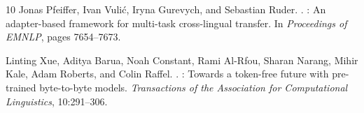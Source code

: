 \begin{thebibliography}{10}
Jonas Pfeiffer, Ivan Vuli\'c, Iryna Gurevych, and Sebastian Ruder.
.
: An adapter-based framework for multi-task cross-lingual
transfer.
\newblock In \emph{Proceedings of EMNLP}, pages 7654--7673.

Linting Xue, Aditya Barua, Noah Constant, Rami Al-Rfou, Sharan Narang, Mihir
Kale, Adam Roberts, and Colin Raffel.
.
: Towards a token-free future with pre-trained byte-to-byte
models.
\newblock \emph{Transactions of the Association for Computational
Linguistics}, 10:291--306.

\end{thebibliography}

\appendix
\onecolumn
